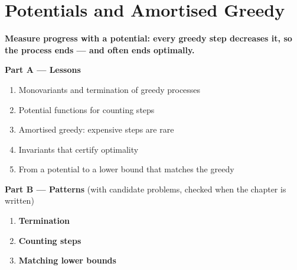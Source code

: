\chapter{Potentials and Amortised Greedy}
\label{ch:potentials}

\begin{tcolorbox}[enhanced, colback=white, colframe=secondaryblue, boxrule=1pt, arc=2mm]
\textbf{\large\textcolor{primaryblue}{Measure progress with a potential: every greedy step decreases it, so the process ends --- and often ends optimally.}}
\end{tcolorbox}


\begin{plannedbox}
\textbf{Part A --- Lessons}
\begin{enumerate}[leftmargin=*, label=\textbf{A\arabic*.}, itemsep=1pt]
    \item Monovariants and termination of greedy processes
    \item Potential functions for counting steps
    \item Amortised greedy: expensive steps are rare
    \item Invariants that certify optimality
    \item From a potential to a lower bound that matches the greedy
\end{enumerate}
\textbf{Part B --- Patterns} (with candidate problems, checked when the chapter is written)
\begin{enumerate}[leftmargin=*, label=\textbf{P\arabic*.}, itemsep=1pt]
    \item \textbf{Termination}
    \item \textbf{Counting steps}
    \item \textbf{Matching lower bounds}
\end{enumerate}
\end{plannedbox}
